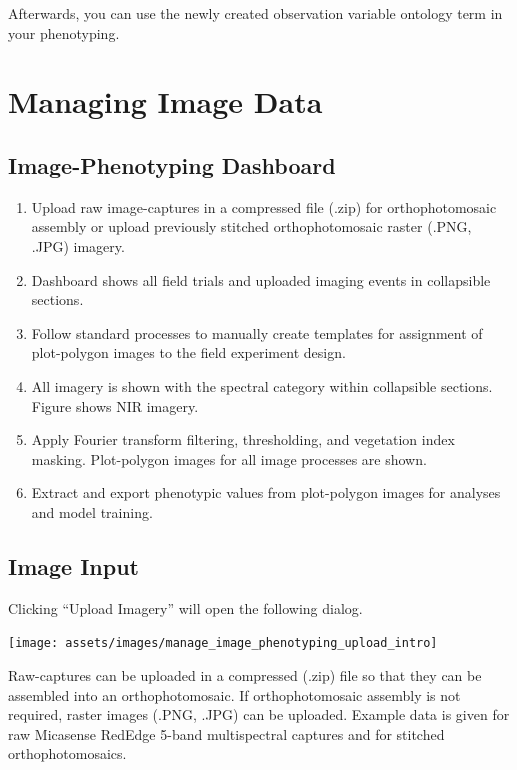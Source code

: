\documentclass[
  12pt,
]{book}
\providecommand{\tightlist}{%
  \setlength{\itemsep}{0pt}\setlength{\parskip}{0pt}}
\begin{document}
Afterwards, you can use the newly created observation variable ontology term in your phenotyping.

\hypertarget{managing-image-data}{%
\chapter{Managing Image Data}\label{managing-image-data}}

\hypertarget{image-phenotyping-dashboard}{%
\section{Image-Phenotyping Dashboard}\label{image-phenotyping-dashboard}}

\begin{enumerate}
\def\labelenumi{\arabic{enumi}.}
\tightlist
\item
  Upload raw image-captures in a compressed file (.zip) for orthophotomosaic assembly or upload previously stitched orthophotomosaic raster (.PNG, .JPG) imagery.
\item
  Dashboard shows all field trials and uploaded imaging events in collapsible sections.
\item
  Follow standard processes to manually create templates for assignment of plot-polygon images to the field experiment design.
\item
  All imagery is shown with the spectral category within collapsible sections. Figure shows NIR imagery.
\item
  Apply Fourier transform filtering, thresholding, and vegetation index masking. Plot-polygon images for all image processes are shown.
\item
  Extract and export phenotypic values from plot-polygon images for analyses and model training.
\end{enumerate}

\hypertarget{image-input}{%
\section{Image Input}\label{image-input}}

Clicking ``Upload Imagery'' will open the following dialog.

\begin{center}\texttt{[image: assets/images/manage\_image\_phenotyping\_upload\_intro]} \end{center}

Raw-captures can be uploaded in a compressed (.zip) file so that they can be assembled into an orthophotomosaic. If orthophotomosaic assembly is not required, raster images (.PNG, .JPG) can be uploaded. Example data is given for raw Micasense RedEdge 5-band multispectral captures and for stitched orthophotomosaics.
\end{document}
